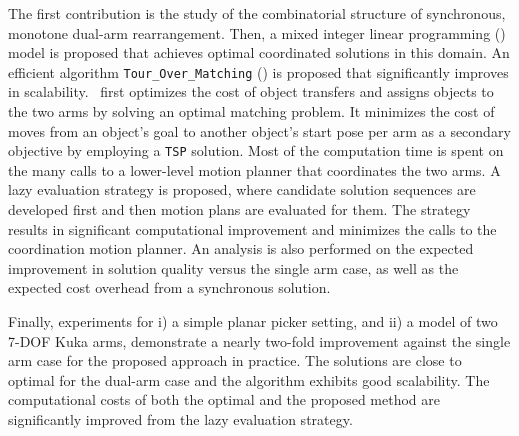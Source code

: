 The first contribution is the study of the combinatorial structure of
synchronous, monotone dual-arm rearrangement. Then, a mixed integer linear programming (\milp) model is
proposed that achieves optimal coordinated solutions in this domain.
An efficient algorithm {\tt Tour\_Over\_Matching} (\algo) is proposed
that significantly improves in scalability. \algo\ first optimizes the
cost of object transfers and assigns objects to the two arms by
solving an optimal matching problem. It minimizes the cost of
moves from an object's goal to another object's start pose per
arm as a secondary objective by employing a {\tt TSP} solution. Most
of the computation time is spent on the many calls to a
lower-level motion planner that coordinates the two arms. A lazy
evaluation strategy is proposed, where candidate solution sequences
are developed first and then motion plans are evaluated for them. The
strategy results in significant computational improvement and
minimizes the calls to the coordination motion planner.  An analysis
is also performed on the expected improvement in solution quality
versus the single arm case, as well as the expected cost overhead from a
synchronous solution.

Finally, experiments for i) a simple planar picker setting, and ii) a
model of two 7-DOF Kuka arms, demonstrate a nearly two-fold
improvement against the single arm case for the proposed approach in practice. The
solutions are close to optimal for the dual-arm case and the algorithm
exhibits good scalability. The computational costs of both the optimal
and the proposed method are significantly improved from the lazy
evaluation strategy. 

